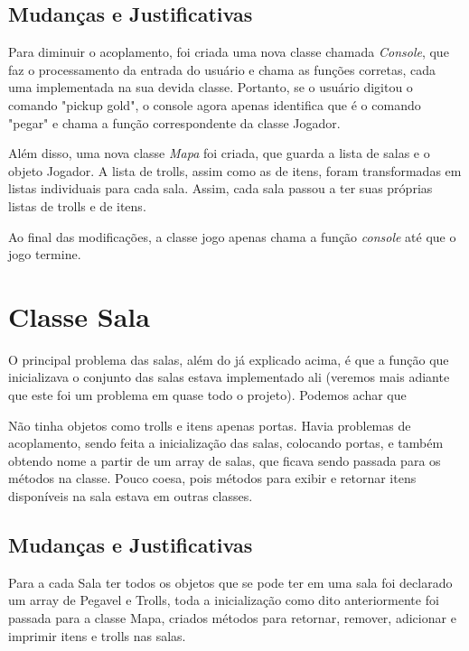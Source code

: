 \documentclass[runningheads,a4paper]{llncs}
\begin{document}
\subsection{Mudanças e Justificativas}

Para diminuir o acoplamento, foi criada uma nova classe chamada \emph{Console}, que faz o processamento da entrada do usuário e chama as funções corretas, cada uma implementada na sua devida classe. Portanto, se o usuário digitou o comando "pickup gold", o console agora apenas identifica que é o comando "pegar" e chama a função correspondente da classe Jogador.

Além disso, uma nova classe \emph{Mapa} foi criada, que guarda a lista de salas e o objeto Jogador. A lista de trolls, assim como as de itens, foram transformadas em listas individuais para cada sala. Assim, cada sala passou a ter suas próprias listas de trolls e de itens.

Ao final das modificações, a classe jogo apenas chama a função \emph{console} até que o jogo termine.

\section{Classe Sala}

O principal problema das salas, além do já explicado acima, é que a função que inicializava o conjunto das salas estava implementado ali (veremos mais adiante que este foi um problema em quase todo o projeto). Podemos achar que %

Não tinha objetos como trolls e itens apenas portas. Havia problemas de acoplamento, sendo feita a inicialização das salas, colocando portas, e também obtendo nome a partir de um array de salas, que ficava sendo passada para os métodos na classe. Pouco coesa, pois métodos para exibir e retornar itens disponíveis na sala estava em outras classes.

\subsection{Mudanças e Justificativas}

Para a cada Sala ter todos os objetos que se pode ter em uma sala foi declarado um array de Pegavel e Trolls, toda a inicialização como dito anteriormente foi passada para a classe Mapa, criados métodos para retornar, remover, adicionar e imprimir itens e trolls nas salas.
\end{document}
